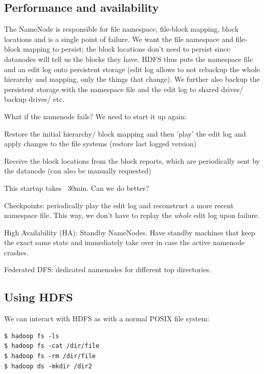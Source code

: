 \documentclass[11pt,oneside,a4paper]{article}
\begin{document}
\subsection{Performance and availability}

The NameNode is responsible for file namespace, file-block mapping, block locations and is a single point of failure. We want the file namespace and file-block mapping to persist; the block locations don't need to persist since datanodes will tell us the blocks they have. HDFS thus puts the namespace file and an edit log onto persistent storage (edit log allows to not rebackup the whole hierarchy and mapping, only the things that change). We further also backup the persistent storage with the namespace file and the edit log to shared drives/ backup drives/ etc.

What if the namenode fails? We need to start it up again:

\begin{compactitem}
	\item Restore the initial hierarchy/ block mapping and then 'play' the edit log and apply changes to the file systems (restore last logged version)
	\item Receive the block locations from the block reports, which are periodically sent by the datanode (can also be manually requested)
\end{compactitem}

This startup takes ~30min. Can we do better?

\begin{compactitem}
	\item Checkpoints: periodically play the edit log and reconstruct a more recent namespace file. This way, we don't have to replay the \textit{whole} edit log upon failure.
	\item High Availability (HA): Standby NameNodes. Have standby machines that keep the exact same state and immediately take over in case the active namenode crashes.
	\item Federated DFS: dedicated namenodes for different top directories.
\end{compactitem}

\subsection{Using HDFS}

We can interact with HDFS as with a normal POSIX file system:

\vspace{-\topsep}
\begin{verbatim}
$ hadoop fs -ls
$ hadoop fs -cat /dir/file
$ hadoop fs -rm /dir/file
$ hadoop ds -mkdir /dir2
\end{verbatim}
\end{document}
